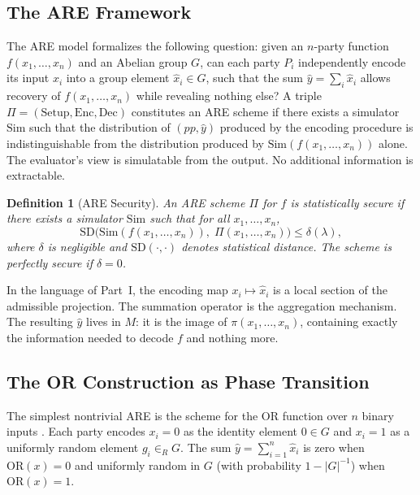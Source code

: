 \documentclass[12pt, a4paper]{article}
\theoremstyle{essaystyle}
\newtheorem{definition}{Definition}
\begin{document}
\subsection{The ARE Framework}

The ARE model \citep{halevi2023additive} formalizes the following question: given an
$n$-party function $f(x_1, \ldots, x_n)$ and an Abelian group $G$, can each party
$P_i$ independently encode its input $x_i$ into a group element $\hat{x}_i \in G$,
such that the sum $\hat{y} = \sum_i \hat{x}_i$ allows recovery of $f(x_1, \ldots, x_n)$
while revealing nothing else? A triple $\Pi = (\mathrm{Setup}, \mathrm{Enc},
\mathrm{Dec})$ constitutes an ARE scheme if there exists a simulator $\mathrm{Sim}$
such that the distribution of $(pp, \hat{y})$ produced by the encoding procedure is
indistinguishable from the distribution produced by $\mathrm{Sim}(f(x_1, \ldots, x_n))$
alone. The evaluator's view is simulatable from the output. No additional information
is extractable.

\begin{definition}[ARE Security]
An ARE scheme $\Pi$ for $f$ is \emph{statistically secure} if there exists a simulator
$\mathrm{Sim}$ such that for all $x_1, \ldots, x_n$,
\[
\mathrm{SD}\bigl(\mathrm{Sim}(f(x_1,\ldots,x_n)),\; \Pi(x_1,\ldots,x_n)\bigr) \leq \delta(\lambda),
\]
where $\delta$ is negligible and $\mathrm{SD}(\cdot,\cdot)$ denotes statistical
distance. The scheme is \emph{perfectly secure} if $\delta = 0$.
\end{definition}

In the language of Part~I, the encoding map $x_i \mapsto \hat{x}_i$ is a local section
of the admissible projection. The summation operator is the aggregation mechanism. The
resulting $\hat{y}$ lives in $M$: it is the image of $\pi(x_1, \ldots, x_n)$,
containing exactly the information needed to decode $f$ and nothing more.

\subsection{The OR Construction as Phase Transition}

The simplest nontrivial ARE is the scheme for the $\mathrm{OR}$ function over $n$
binary inputs \citep{halevi2023additive}. Each party encodes $x_i = 0$ as the identity
element $0 \in G$ and $x_i = 1$ as a uniformly random element $g_i \in_R G$. The sum
$\hat{y} = \sum_{i=1}^n \hat{x}_i$ is zero when $\mathrm{OR}(x) = 0$ and uniformly
random in $G$ (with probability $1 - |G|^{-1}$) when $\mathrm{OR}(x) = 1$.
\end{document}
